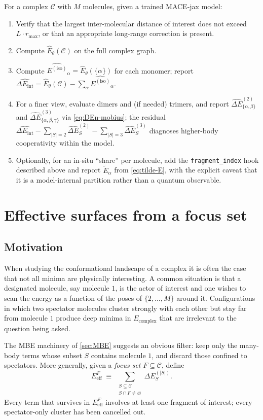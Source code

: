 \documentclass[11pt,a4paper]{article}
\newcommand{\Eint}{\Delta E_{\mathrm{int}}}
\newcommand{\Eiso}{E^{(\mathrm{iso})}}
\newcommand{\Ecpl}{E_{\mathrm{complex}}}
\newcommand{\rmax}{r_{\mathrm{max}}}
\begin{document}
For a complex $\mathcal{C}$ with $M$ molecules, given a trained
\textsc{MACE}-jax model:
\begin{enumerate}[leftmargin=1.6em]
\item Verify that the largest inter-molecular distance of interest does not
exceed $L \cdot \rmax$, or that an appropriate long-range correction is
present.
\item Compute $\widehat{E}_\theta(\mathcal{C})$ on the full complex graph.
\item Compute $\widehat{\Eiso}_\alpha = \widehat{E}_\theta(\{\alpha\})$ for
each monomer; report
$\widehat{\Eint} = \widehat{E}_\theta(\mathcal{C}) - \sum_\alpha \widehat{\Eiso}_\alpha$.
\item For a finer view, evaluate dimers and (if needed) trimers, and report
$\widehat{\Delta E}^{(2)}_{\{\alpha,\beta\}}$ and
$\widehat{\Delta E}^{(3)}_{\{\alpha,\beta,\gamma\}}$ via
\cref{eq:DEn-mobius}; the residual
$\widehat{\Eint} - \sum_{|S|=2}\widehat{\Delta E}^{(2)}_S - \sum_{|S|=3}\widehat{\Delta E}^{(3)}_S$
diagnoses higher-body cooperativity within the model.
\item Optionally, for an in-situ ``share'' per molecule, add the
\texttt{fragment\_index} hook described above and report $\widetilde{E}_\alpha$
from \cref{eq:tilde-E}, with the explicit caveat that it is a model-internal
partition rather than a quantum observable.
\end{enumerate}

\section{Effective surfaces from a focus set}
\label{sec:effective}

\subsection{Motivation}

When studying the conformational landscape of a complex it is often the case
that not all minima are physically interesting. A common situation is that a
designated molecule, say molecule $1$, is the actor of interest and one wishes
to scan the energy as a function of the poses of $\{2,\dots,M\}$ around it.
Configurations in which two spectator molecules cluster strongly with each
other but stay far from molecule $1$ produce deep minima in $\Ecpl$ that are
irrelevant to the question being asked.

The MBE machinery of \cref{sec:MBE} suggests an obvious filter: keep only the
many-body terms whose subset $S$ contains molecule $1$, and discard those
confined to spectators. More generally, given a \emph{focus set}
$F \subseteq \mathcal{C}$, define
\begin{equation}
E_{\mathrm{eff}}^{F}
\;\equiv\; \!\!\!\!\sum_{\substack{S \subseteq \mathcal{C}\\ S \cap F \ne \varnothing}}
        \!\!\!\! \Delta E^{(|S|)}_{S}.
\label{eq:Eeff-MBE}
\end{equation}
Every term that survives in $E_{\mathrm{eff}}^{F}$ involves at least one
fragment of interest; every spectator-only cluster has been cancelled out.
\end{document}
